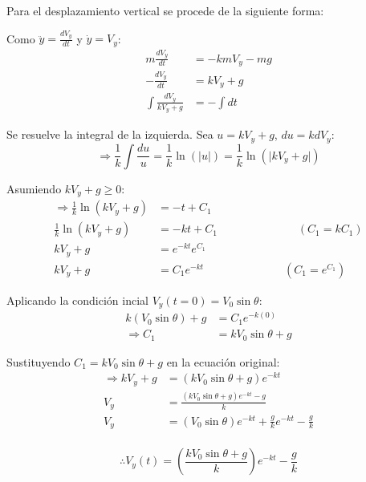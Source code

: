 Para el desplazamiento vertical se procede de la siguiente forma:
\vspace{5 mm}

Como $\ddot{y}=\frac{dV_{y}}{dt}$ y $\dot{y}=V_{y}$:
\begin{align*}
    m\frac{dV_{y}}{dt} &= -kmV_{y}-mg\\
    -\frac{dV_{y}}{dt} &= kV_{y}+g\\
    \int \frac{dV_{y}}{kV_{y}+g} &= -\int dt
\end{align*}

\vspace{5 mm}
Se resuelve la integral de la izquierda. Sea $u=kV_{y}+g$, $du=kdV_{y}$:
\begin{equation*}
    \Rightarrow \frac{1}{k} \int \frac{du}{u} = \frac{1}{k} \ln(\lvert u \rvert) = \frac{1}{k} \ln(\lvert kV_{y}+g \rvert)
\end{equation*}

\vspace{5 mm}
Asumiendo $kV_{y}+g \geq 0$:
\begin{align*}
    \Rightarrow \frac{1}{k} \ln(kV_{y}+g) &= -t+C_{1}\\
    \frac{1}{k} \ln(kV_{y}+g) &= -kt+C_{1} \hspace{3cm} (C_{1}=kC_{1})\\
    kV_{y}+g &= e^{-kt}e^{C_{1}}\\
    kV_{y}+g &= C_{1}e^{-kt} \hspace{3cm} (C_{1}=e^{C_{1}})
\end{align*}

\vspace{5 mm}
Aplicando la condición incial $V_{y}(t=0)=V_{0}\sin\theta$:
\begin{align*}
    k(V_{0}\sin\theta)+g &= C_{1}e^{-k(0)}\\
    \Rightarrow C_{1} &= kV_{0}\sin\theta+g
\end{align*}

\vspace{5 mm}
Sustituyendo $C_{1} = kV_{0}\sin\theta+g$ en la ecuación original:
\begin{align*}
    \Rightarrow kV_{y}+g &= (kV_{0}\sin\theta+g)e^{-kt}\\
    V_{y} &= \frac{(kV_{0}\sin\theta+g)e^{-kt}-g}{k}\\
    V_{y} &= (V_{0}\sin\theta)e^{-kt} + \frac{g}{k}e^{-kt} - \frac{g}{k}\\
\end{align*}

\begin{equation*}
    \therefore V_{y}(t) = \left (\frac{kV_{0}\sin\theta+g}{k} \right)e^{-kt} - \frac{g}{k}
\end{equation*}

